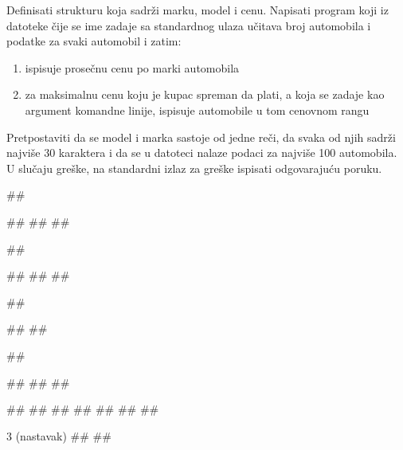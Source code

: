 \begin{Answer}[ref=v3_05]
\end{Answer}


\begin{Exercise}[label=v3_06] 
Definisati strukturu  koja sadrži marku, model i cenu.
Napisati program koji iz datoteke čije se ime zadaje sa standardnog ulaza učitava broj automobila
i podatke za svaki automobil i zatim:
\begin{enumerate}
\setlength\itemsep{0em}
\item ispisuje prosečnu cenu po marki automobila 
\item za maksimalnu cenu koju je kupac spreman da plati, a koja se
zadaje kao argument komandne linije, ispisuje automobile u tom cenovnom
rangu
\end{enumerate}
Pretpostaviti da se model i marka sastoje od jedne reči, da svaka od njih sadrži najviše 30 karaktera i da se u datoteci
nalaze podaci za najviše 100 automobila.
U slučaju greške, na standardni izlaz za greške ispisati odgovarajuću poruku.

\begin{miditest}
\begin{upotreba}{1}
##

#\naslovInt#
##
##

##

#\naslovIzlazZaGresku#
##
##
\end{upotreba}
\end{miditest}
\begin{miditest}
\begin{upotreba}{2}
##

#\naslovIzlazZaGresku#
##
\end{upotreba}
\end{miditest}


\begin{miditest}
\begin{upotreba}{3}
##

#\naslovInt#
##
##

##
##
##
##
##
##
##
\end{upotreba}
\end{miditest}
\begin{miditest}
\begin{upotreba}{3 (nastavak)}
##
##


\end{upotreba}
\end{miditest}
\end{Exercise}
